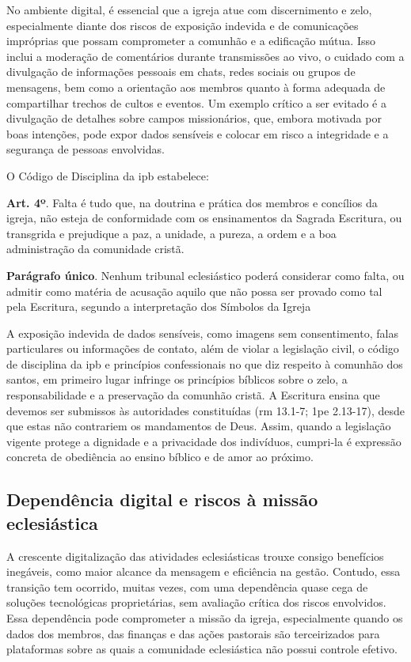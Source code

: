 No ambiente digital, é essencial que a igreja atue com discernimento e zelo, especialmente diante dos riscos de exposição indevida e de comunicações impróprias que possam comprometer a comunhão e a edificação mútua. Isso inclui a moderação de comentários durante transmissões ao vivo, o cuidado com a divulgação de informações pessoais em chats, redes sociais ou grupos de mensagens, bem como a orientação aos membros quanto à forma adequada de compartilhar trechos de cultos e eventos. Um exemplo crítico a ser evitado é a divulgação de detalhes sobre campos missionários, que, embora motivada por boas intenções, pode expor dados sensíveis e colocar em risco a integridade e a segurança de pessoas envolvidas.

O Código de Disciplina da \gls{ipb} estabelece:

\begin{citacao}
    \textbf{Art. 4º}. Falta é tudo que, na doutrina e prática dos membros e concílios da igreja, não esteja de conformidade com os ensinamentos da Sagrada Escritura, ou transgrida e prejudique a paz, a unidade, a pureza, a ordem e a boa administração da comunidade cristã.

    \textbf{Parágrafo único}. Nenhum tribunal eclesiástico poderá considerar como falta, ou admitir como matéria de acusação aquilo que não possa ser provado como tal pela Escritura, segundo a interpretação dos Símbolos da Igreja \cite[art.~4]{ipb_codigodisciplina}
\end{citacao} 

A exposição indevida de dados sensíveis, como imagens sem consentimento, falas particulares ou informações de contato, além de violar a legislação civil, o código de disciplina da \gls{ipb} e princípios confessionais no que diz respeito à comunhão dos santos, em primeiro lugar infringe os princípios bíblicos sobre o zelo, a responsabilidade e a preservação da comunhão cristã. A Escritura ensina que devemos ser submissos às autoridades constituídas (\gls{rm} 13.1-7; \gls{1pe} 2.13-17), desde que estas não contrariem os mandamentos de Deus. Assim, quando a legislação vigente protege a dignidade e a privacidade dos indivíduos, cumpri-la é expressão concreta de obediência ao ensino bíblico e de amor ao próximo.

\subsection{Dependência digital e riscos à missão eclesiástica}

A crescente digitalização das atividades eclesiásticas trouxe consigo benefícios inegáveis, como maior alcance da mensagem e eficiência na gestão. Contudo, essa transição tem ocorrido, muitas vezes, com uma dependência quase cega de soluções tecnológicas proprietárias, sem avaliação crítica dos riscos envolvidos. Essa dependência pode comprometer a missão da igreja, especialmente quando os dados dos membros, das finanças e das ações pastorais são terceirizados para plataformas sobre as quais a comunidade eclesiástica não possui controle efetivo.

